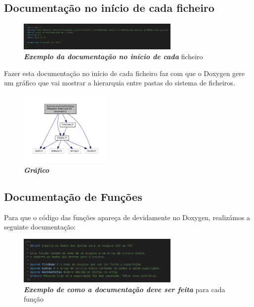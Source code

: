 \documentclass[a4wide]{report}
\begin{document}
{{{{\subsection{Documentação no início de cada ficheiro}
\Large
\begin{figure}[hbt]
    \centering
    \includegraphics[width=0.70\textwidth]{imagem_121.png}
    \caption{\textbf{\textit{Exemplo da documentação no início de cada}} ficheiro\label{fig:imagem}}
\end{figure}
Fazer esta documentação no início de cada ficheiro faz com que o Doxygen gere um gráfico que vai mostrar a hierarquia entre pastas do sistema de ficheiros.
\begin{figure}[hbt]
    \centering
    \includegraphics[width=0.40\textwidth]{main_8c__incl.pdf}
    \caption{\textbf{\textit{Gráfico}}\label{fig:image}}
\end{figure}

\subsection{Documentação de Funções}
\Large
Para que o código das funções apareça de devidamente no Doxygen, realizámos a seguinte documentação:
\begin{figure}[hbt]
    \centering
    \includegraphics[width=0.70\textwidth]{imagem_13.png}
    \caption{\textbf{\textit{Exemplo de como a documentação deve ser feita}} para cada função\label{fig:imagem}}
\end{figure}

}}}}
\end{document}
